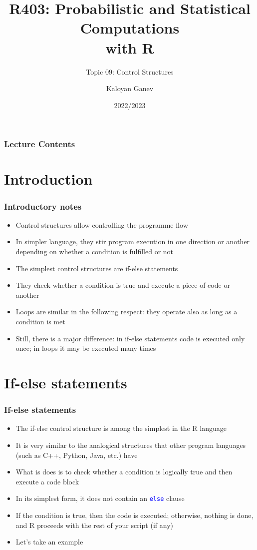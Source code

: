 \documentclass[10pt]{beamer}
\title{R403: Probabilistic and Statistical Computations\\ with R}
\subtitle{Topic 09: \textcolor{myred}{Control Structures}}
\author{Kaloyan Ganev}
\date{2022/2023}
\newcommand{\cc}[1]{\texttt{\textcolor{blue}{#1}}}
\theoremstyle{definition}
\begin{document}
\maketitle

\begin{frame}[fragile]
\frametitle{Lecture Contents}
\tableofcontents
\end{frame}
 
\section{Introduction}
\begin{frame}[fragile]
\frametitle{Introductory notes}
\begin{itemize}
	\item Control structures allow controlling the programme flow
	\item In simpler language, they stir program execution in one direction or another depending on whether a condition is fulfilled or not
	\item The simplest control structures are if-else statements
	\item They check whether a condition is true and execute a piece of code or another
	\item Loops are similar in the following respect: they operate also as long as a condition is met
	\item Still, there is a major difference: in if-else statements code is executed only once; in loops it may be executed many times
\end{itemize}
\end{frame}

\section{If-else statements}
\begin{frame}[fragile]
\frametitle{If-else statements}
\begin{itemize}
	\item The if-else control structure is among the simplest in the R language
	\item It is very similar to the analogical structures that other program languages (such as C++, Python, Java, etc.) have
	\item What is does is to check whether a condition is logically true and then execute a code block
	\item In its simplest form, it does not contain an \cc{else} clause
	\item If the condition is true, then the code is executed; otherwise, nothing is done, and R proceeds with the rest of your script (if any)
	\item Let's take an example
\end{itemize} 
\end{frame}
\end{document}
